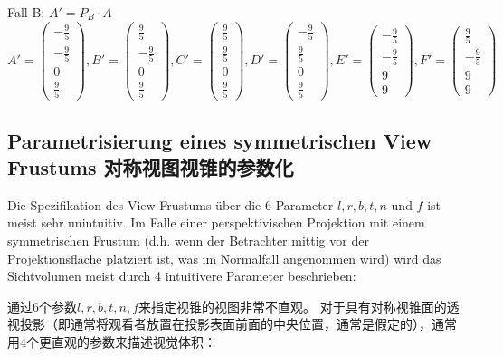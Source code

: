 \documentclass[fleqn]{article}
\begin{document}
Fall B: $A' = P_B \cdot A $
$$
A'=
\begin{pmatrix}
    -\frac{9}{5} \\ -\frac{9}{5} \\ 0 \\ \frac{9}{5}    
\end{pmatrix},
B'=
\begin{pmatrix}
    \frac{9}{5} \\ -\frac{9}{5} \\ 0 \\ \frac{9}{5}    
\end{pmatrix},
C'=
\begin{pmatrix}
    \frac{9}{5} \\ \frac{9}{5} \\ 0 \\ \frac{9}{5}    
\end{pmatrix},
D'=
\begin{pmatrix}
    -\frac{9}{5} \\ \frac{9}{5} \\ 0 \\ \frac{9}{5}    
\end{pmatrix},
E'=
\begin{pmatrix}
    -\frac{9}{5} \\ -\frac{9}{5} \\ 9 \\ 9    
\end{pmatrix},
F'=
\begin{pmatrix}
    \frac{9}{5} \\ -\frac{9}{5} \\ 9 \\ 9    
\end{pmatrix}
$$

\subsection{Parametrisierung eines symmetrischen View Frustums 对称视图视锥的参数化}

Die Spezifikation des View-Frustums über die 6 Parameter $l, r, b, t, n$ und $f$ ist meist sehr unintuitiv. Im Falle einer perspektivischen Projektion mit einem symmetrischen Frustum (d.h. wenn der Betrachter mittig vor der Projektionsfläche platziert ist, was im Normalfall angenommen wird) wird das Sichtvolumen meist durch 4 intuitivere Parameter beschrieben:

通过6个参数$l,r,b,t,n, f$来指定视锥的视图非常不直观。 对于具有对称视锥面的透视投影（即通常将观看者放置在投影表面前面的中央位置，通常是假定的），通常用4个更直观的参数来描述视觉体积：
\end{document}
